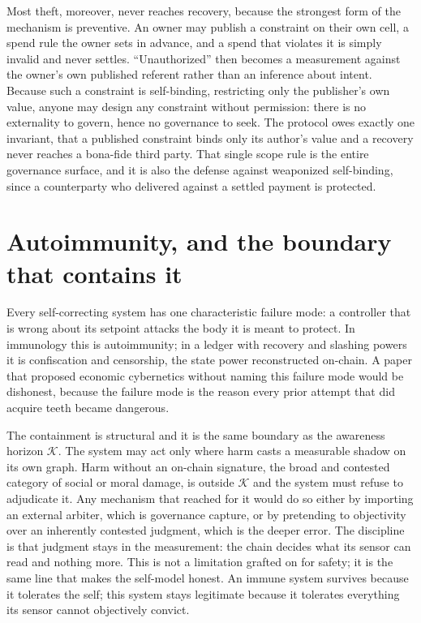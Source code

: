 \documentclass[10pt]{article}
\begin{document}
Most theft, moreover, never reaches recovery, because the strongest form of the mechanism is preventive. An
owner may publish a constraint on their own cell, a spend rule the owner sets in advance, and a spend that
violates it is simply invalid and never settles. ``Unauthorized'' then becomes a measurement against the
owner's own published referent rather than an inference about intent. Because such a constraint is
self-binding, restricting only the publisher's own value, anyone may design any constraint without
permission: there is no externality to govern, hence no governance to seek. The protocol owes exactly one
invariant, that a published constraint binds only its author's value and a recovery never reaches a
bona-fide third party. That single scope rule is the entire governance surface, and it is also the defense
against weaponized self-binding, since a counterparty who delivered against a settled payment is protected.

\section{Autoimmunity, and the boundary that contains it}
\label{sec:auto}

Every self-correcting system has one characteristic failure mode: a controller that is wrong about its
setpoint attacks the body it is meant to protect. In immunology this is autoimmunity; in a ledger with
recovery and slashing powers it is confiscation and censorship, the state power reconstructed on-chain. A
paper that proposed economic cybernetics without naming this failure mode would be dishonest, because the
failure mode is the reason every prior attempt that did acquire teeth became dangerous.

The containment is structural and it is the same boundary as the awareness horizon $\mathcal{K}$. The
system may act only where harm casts a measurable shadow on its own graph. Harm without an on-chain
signature, the broad and contested category of social or moral damage, is outside $\mathcal{K}$ and the
system must refuse to adjudicate it. Any mechanism that reached for it would do so either by importing an
external arbiter, which is governance capture, or by pretending to objectivity over an inherently
contested judgment, which is the deeper error. The discipline is that judgment stays in the measurement:
the chain decides what its sensor can read and nothing more. This is not a limitation grafted on for
safety; it is the same line that makes the self-model honest. An immune system survives because it
tolerates the self; this system stays legitimate because it tolerates everything its sensor cannot
objectively convict.
\end{document}
